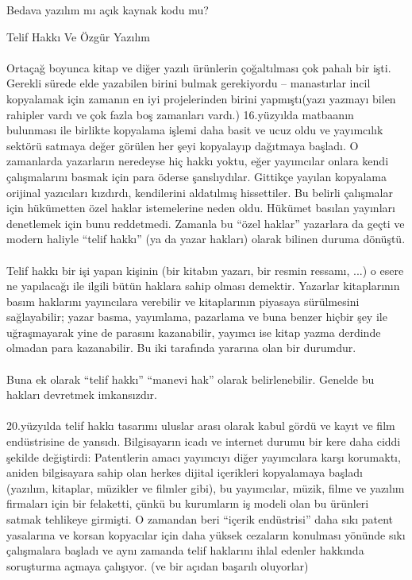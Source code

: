\documentclass[10pt,a5paper]{book}
\begin{document}
\begin{section}{Bedava yazılım mı açık kaynak kodu mu?}
\begin{subsection}{Telif Hakkı Ve Özgür Yazılım}
\paragraph{}{Ortaçağ boyunca kitap ve   diğer yazılı ürünlerin çoğaltılması çok pahalı bir  
işti. Gerekli sürede elde yazabilen birini bulmak gerekiyordu -- manastırlar incil kopyalamak için zamanın en iyi projelerinden birini yapmıştı(yazı yazmayı bilen rahipler vardı ve çok fazla boş zamanları vardı.) 16.yüzyılda matbaanın bulunması ile birlikte kopyalama işlemi daha basit ve ucuz oldu ve yayımcılık sektörü satmaya değer görülen her şeyi kopyalayıp dağıtmaya başladı. O zamanlarda yazarların neredeyse hiç hakkı yoktu, eğer yayımcılar onlara kendi çalışmalarını basmak için para öderse şanslıydılar. Gittikçe yayılan kopyalama orijinal yazıcıları kızdırdı, kendilerini aldatılmış hissettiler. Bu belirli çalışmalar için hükümetten özel haklar istemelerine neden oldu. Hükümet basılan yayınları denetlemek için bunu reddetmedi. Zamanla bu “özel haklar” yazarlara da geçti ve modern haliyle “telif hakkı” (ya da yazar hakları) olarak bilinen duruma dönüştü.}
\paragraph{}{Telif hakkı bir işi yapan kişinin (bir kitabın yazarı, bir resmin ressamı, ...) o esere ne yapılacağı ile ilgili bütün haklara sahip olması demektir. Yazarlar kitaplarının basım haklarını yayıncılara verebilir ve kitaplarının piyasaya sürülmesini sağlayabilir; yazar basma, yayımlama, pazarlama ve buna benzer hiçbir şey ile uğraşmayarak yine de parasını kazanabilir, yayımcı ise kitap yazma derdinde olmadan para kazanabilir. Bu iki tarafında yararına olan bir durumdur.}
\paragraph{}{Buna ek olarak “telif hakkı” “manevi hak” olarak belirlenebilir. Genelde bu hakları devretmek imkansızdır.}
\paragraph{}{20.yüzyılda telif hakkı tasarımı uluslar arası olarak kabul gördü ve kayıt ve film endüstrisine de yansıdı. Bilgisayarın icadı ve internet durumu bir kere daha ciddi şekilde değiştirdi: Patentlerin amacı yayımcıyı diğer yayımcılara karşı korumaktı, aniden bilgisayara sahip olan herkes dijital içerikleri kopyalamaya başladı (yazılım, kitaplar, müzikler ve filmler gibi), bu yayımcılar, müzik, filme ve yazılım firmaları için bir felaketti, çünkü bu kurumların iş modeli olan bu ürünleri satmak tehlikeye girmişti. O zamandan beri “içerik endüstrisi” daha sıkı patent yasalarına ve korsan kopyacılar için daha yüksek cezaların konulması yönünde sıkı çalışmalara başladı ve aynı zamanda telif haklarını ihlal edenler hakkında soruşturma açmaya çalışıyor. (ve bir açıdan başarılı oluyorlar)}

\end{subsection}
\end{section}
\end{document}

